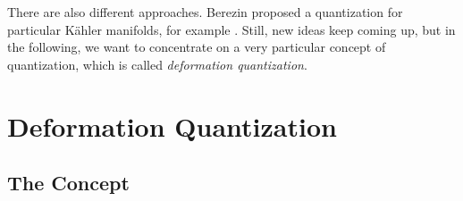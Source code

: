 There are also different approaches. Berezin proposed a quantization for 
particular K\"ahler manifolds, for example 
\cite{berezin:1975a, berezin:1975b, berezin:1975c}. Still, new ideas keep coming 
up, but in the following, we want to concentrate on a very particular concept of 
quantization, which is called \emph{deformation quantization}.



\section{Deformation Quantization}
\label{sec:chap2_DQ}

\subsection{The Concept}
\label{subsec:chap2_Concept}

